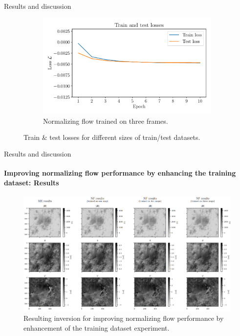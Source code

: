 \documentclass{beamer}
\begin{document}
\begin{frame}[allowframebreaks]{Results and discussion}
\begin{figure}[h]
\begin{subfigure}[t]{0.32\textwidth}
		\centering
		\includegraphics[width=\textwidth]{figures/thesis/nf-milne-eddington-example-5-loss-3train-nflows-piecewisequadratic.pdf}
		\caption{Normalizing flow trained on three frames.}
		\label{fig:nf-milne-eddington-example-5-loss-3train-nflows-piecewisequadratic}
	\end{subfigure}
	\caption{Train \& test losses for different sizes of train/test datasets.}
	\label{fig:nf-milne-eddington-example-5-loss-nflows-piecewisequadratic}
\end{figure}
\end{frame}

\begin{frame}[allowframebreaks]{Results and discussion}
	\framesubtitle{Improving normalizing flow performance by enhancing the training dataset: Results} %
	\vspace{-0.5cm}
\begin{figure}[h!]
	\centering
	\includegraphics[width=\textwidth]{figures/presentation/exp5_fig1.png}
	\caption{Resulting inversion for improving normalizing flow performance by enhancement of the training dataset experiment.}
	\label{fig:exp5_fig1}
\end{figure}
\end{frame}
\end{document}
